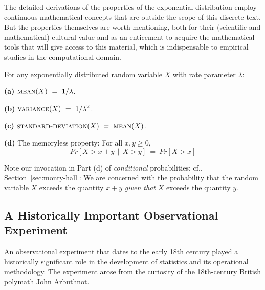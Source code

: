  
 

The detailed derivations of the properties of the exponential distribution employ continuous mathematical concepts that are outside the scope of this discrete text.  But the properties themselves are worth mentioning, both for their (scientific and mathematical) cultural value and as an enticement to acquire the mathematical tools that will give access to this material, which is indispensable to empirical studies in the computational domain.

\begin{prop}
\label{thm:exponential-moments}
For any exponentially distributed random variable $X$ with rate parameter $\lambda$:

{\bf (a)}
$\displaystyle \mbox{\sc mean}(X) \ = \ 1 / \lambda$.

\smallskip

{\bf (b)}
$\displaystyle \mbox{\sc variance}(X) \ = \ 1 / \lambda^2$.

\smallskip

{\bf (c)}
$\displaystyle  \mbox{\sc standard-deviation}(X) \ = \  \mbox{\sc mean}(X)$.

\medskip

{\bf (d)}
The memoryless property:  For all $x, y \geq 0$,
\[ Pr[X > x+y \ \ | \ \ X > y] \ = \ Pr[X > x] \]
\end{prop}

Note our invocation in Part (d) of {\em conditional} probabilities; cf.,
Section~\ref{sec:monty-hall}: We are concerned with the probability
that the random variable $X$ exceeds the quantity $x+y$ {\em given
  that} $X$ exceeds the quantity $y$.




\subsection{A Historically Important Observational Experiment}
\label{sec:Arbuthnot}

An observational experiment that dates to the early 18th century played a historically significant role in the development of statistics and its operational methodology.  The experiment arose from the curiosity of the 18th-century British polymath John Arbuthnot.

\smallskip

